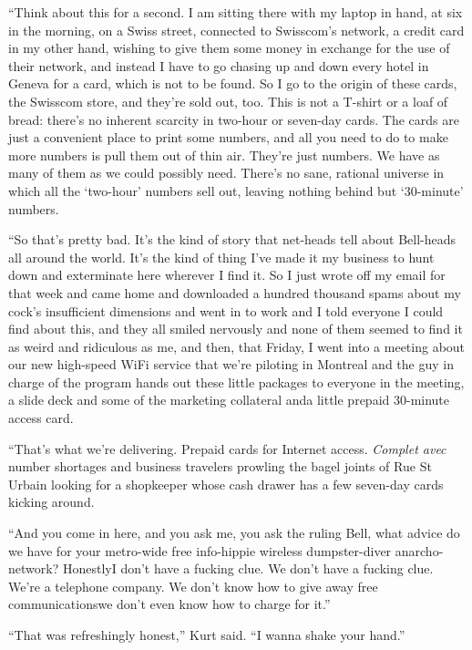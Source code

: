 ``Think about this for a second.  I am sitting there with my laptop in
hand, at six in the morning, on a Swiss street, connected to
Swisscom's network, a credit card in my other hand, wishing to give
them some money in exchange for the use of their network, and instead
I have to go chasing up and down every hotel in Geneva for a card,
which is not to be found.  So I go to the origin of these cards, the
Swisscom store, and they're sold out, too.  This is not a T-shirt or a
loaf of bread:  there's no inherent scarcity in two-hour or seven-day
cards.  The cards are just a convenient place to print some numbers,
and all you need to do to make more numbers is pull them out of thin
air.  They're just numbers.  We have as many of them as we could
possibly need.  There's no sane, rational universe in which all the
`two-hour' numbers sell out, leaving nothing behind but `30-minute'
numbers.

``So that's pretty bad.  It's the kind of story that net-heads tell
about Bell-heads all around the world.  It's the kind of thing I've
made it my business to hunt down and exterminate here wherever I find
it.  So I just wrote off my email for that week and came home and
downloaded a hundred thousand spams about my cock's insufficient
dimensions and went in to work and I told everyone I could find about
this, and they all smiled nervously and none of them seemed to find it
as weird and ridiculous as me, and then, that Friday, I went into a
meeting about our new high-speed WiFi service that we're piloting in
Montreal and the guy in charge of the program hands out these little
packages to everyone in the meeting, a slide deck and some of the
marketing collateral and\dash{}a little prepaid 30-minute access card.

``That's what we're delivering.  Prepaid cards for Internet access. 
\textit{Complet avec} number shortages and business travelers prowling
the bagel joints of Rue St Urbain looking for a shopkeeper whose cash
drawer has a few seven-day cards kicking around.

``And you come in here, and you ask me, you ask the ruling Bell, what
advice do we have for your metro-wide free info-hippie wireless
dumpster-diver anarcho-network?  Honestly\dash{}I don't have a fucking
clue.  We don't have a fucking clue.  We're a telephone company.  We
don't know how to give away free communications\dash{}we don't even know
how to charge for it.''

``That was refreshingly honest,'' Kurt said.  ``I wanna shake your
hand.''

